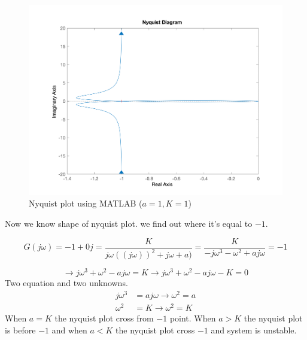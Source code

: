 \begin{figure}[H]
	\caption{Nyquist plot using MATLAB ($a = 1, K = 1$)}
	\centering
	\includegraphics[width=12cm]{../Figure/Q2/MATAB-Nyquist.png}
\end{figure}

Now we know shape of nyquist plot. we find out where it's equal to $-1$.

$$
G(j\omega) = -1 + 0j = \dfrac{K}{j\omega((j\omega))^2 + j\omega + a)} = \dfrac{K}{-j\omega^3 - \omega^2 + aj\omega} = -1
$$

$$
\to j\omega^3 + \omega^2 -aj\omega = K \to j\omega^3 + \omega^2 -aj\omega - K = 0
$$
Two equation and two unknowns.
\begin{align*}
	j\omega^3 &=aj\omega \to \omega^2 = a\\
	\omega^2 &=K \to \omega^2 = K
\end{align*}
When $a = K$ the nyquist plot cross from $-1$ point. When $a>K$ the nyquist plot is before $-1$ and when $a<K$ the nyquist plot cross $-1$ and system is unstable.
 
